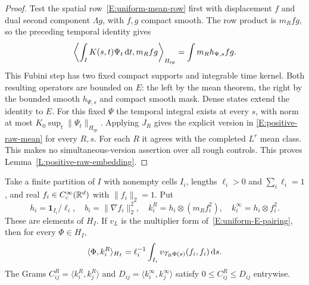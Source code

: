 \begin{proof}
  Test the spatial row~\eqref{E:uniform-mean-row} first with displacement
  $f$ and dual second component $\Lambda g$, with $f,g$ compact smooth.
  The row product is $m_Rfg$, so the preceding temporal identity gives
  \[
    \left\langle\int_IK(s,t)\Psi_t\,\mathrm{d} t,m_Rfg\right\rangle_{H_{\mathrm{sp}}}
    =\int m_Rh_{\Psi,s}fg .
  \]
  This Fubini step has two fixed compact supports and integrable time
  kernel. Both resulting operators are bounded on $E$: the left by
  the mean theorem, the right by the bounded smooth $h_{\Psi,s}$
  and compact smooth mask. Dense states extend the identity to $E$.
  For this fixed $\Psi$ the temporal integral exists at every $s$,
  with norm at most $K_0\sup_t\|\Psi_t\|_{H_{\mathrm{sp}}}$.
  Applying $J_R$ gives the explicit version in
  \eqref{E:positive-raw-mean} for every $R,s$.
  For each $R$ it agrees with the completed $L^r$ mean class.
  This makes no simultaneous-version assertion over all rough controls.
  This proves Lemma~\ref{L:positive-raw-embedding}.
\end{proof}

\begin{lemma}
  \label{L:positive-physical-gram}
  Take a finite partition of $I$ with nonempty cells $I_i$,
  lengths $\ell_i>0$ and $\sum_i\ell_i=1$, and real
  $f_i\in C_c^\infty(\mathbb{R}^d)$ with $\|f_i\|_2=1$.
  Put
  \[
    h_i=\mathbf1_{I_i}/\ell_i,\quad b_i=\|\nabla f_i\|_2^2,\quad
    k_i^R=h_i\otimes(m_Rf_i^2),\quad
    k_i^\infty=h_i\otimes f_i^2 .
  \]
  These are elements of $H_I$. If $v_L$ is the multiplier form
  of~\eqref{E:uniform-E-pairing}, then for every $\Phi\in H_I$,
  \begin{equation}\label{E:positive-label-row}
    \langle\Phi,k_i^R\rangle_{H_I}
    =\ell_i^{-1}\int_{I_i}v_{\mathcal T_R\Phi(s)}(f_i,f_i)\,\mathrm{d} s .
  \end{equation}
  The Grams $C^R_{ij}=\langle k_i^R,k_j^R\rangle$ and
  $D_{ij}=\langle k_i^\infty,k_j^\infty\rangle$ satisfy
  $0\le C^R_{ij}\le D_{ij}$ entrywise.
\end{lemma}

